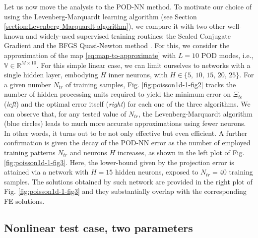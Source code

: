 \documentclass[12pt, a4paper, twoside, openright, notitlepage]{report}
\numberwithin{equation}{chapter}
\theoremstyle{theorem}
\theoremstyle{definition}
\theoremstyle{remark}
\theoremstyle{proposition}
\numberwithin{figure}{chapter}
\begin{document}
		Let us now move the analysis to the POD-NN method. To motivate our choice of using the Levenberg-Marquardt learning algorithm (see Section \ref{section:Levenberg-Marquardt algorithm}), we compare it with two other well-known and widely-used supervised training routines: the Scaled Conjugate Gradient \cite{Mol93} and the BFGS Quasi-Newton method \cite{GMW81}. For this, we consider the approximation of the map \eqref{eq:map-to-approximate} with $L = 10$ POD modes, i.e., $\mathbb{V} \in \mathbb{R}^{M \times 10}$. For this simple linear case, we can limit ourselves to networks with a single hidden layer, embodying $H$ inner neurons, with $H \in \big\lbrace 5, \, 10, \, 15, \, 20, \, 25 \big\rbrace$. For a given number $N_{tr}$ of training samples, Fig. \ref{fig:poisson1d-1-fig2} tracks the number of hidden processing units required to yield the minimum error on $\Xi_{te}$ (\emph{left}) and the optimal error itself (\emph{right}) for each one of the three algorithms. We can observe that, for any tested value of $N_{tr}$, the Levenberg-Marquardt algorithm (blue circles) leads to much more accurate approximations using fewer neurons. In other words, it turns out to be not only effective but even efficient. A further confirmation is given the decay of the POD-NN error as the number of employed training patterns $N_{tr}$ and neurons $H$ increases, as shown in the left plot of Fig. \ref{fig:poisson1d-1-fig3}. Here, the lower-bound given by the projection error is attained via a network with $H = 15$ hidden neurons, exposed to $N_{tr} = 40$ training samples. The solutions obtained by such network are provided in the right plot of Fig. \ref{fig:poisson1d-1-fig3} and they substantially overlap with the corresponding FE solutions. 
				
	\subsection{Nonlinear test case, two parameters}
	\label{section:poisson1d-2}
	
\end{document}
